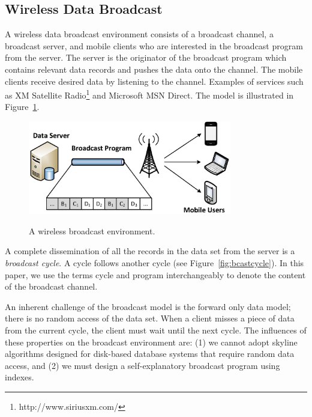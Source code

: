 \subsection{Wireless Data Broadcast}\label{sec:wireless_broadcast}

A wireless data broadcast environment consists of a broadcast
channel, a broadcast server, and mobile clients who are interested
in the broadcast program from the server. The server is the
originator of the broadcast program which contains relevant data
records and pushes the data onto the channel. The mobile clients
receive desired data by listening to the channel. Examples of
services such as XM Satellite
Radio\footnote{http://www.siriusxm.com/} and Microsoft MSN Direct.
The model is illustrated in Figure~\ref{fig:broadcast}.

\begin{figure}[!h]
\begin{center}
\includegraphics[width=3.5in]{Figures/on_demand.eps}
\vspace*{-5pt} \caption{A wireless broadcast environment.}
\vspace*{-10pt} \label{fig:broadcast}
\end{center}
\end{figure}

A complete dissemination of all the records in the data set from
the server is a \emph{broadcast cycle}. A cycle follows another
cycle (see Figure~\ref{fig:bcastcycle}). In this paper, we use the
terms cycle and program interchangeably to denote the content of
the broadcast channel.

An inherent challenge of the broadcast model is the forward only
data model; there is no random access of the data set. When a
client misses a piece of data from the current cycle, the client
must wait until the next cycle. The influences of these properties
on the broadcast environment are: (1) we cannot adopt skyline
algorithms designed for disk-based database systems that require
random data access, and (2) we must design a self-explanatory
broadcast program using indexes.

